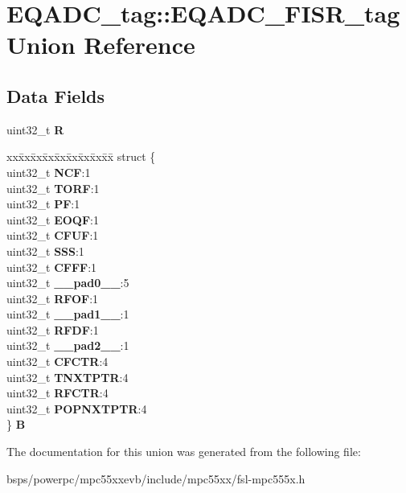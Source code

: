 \hypertarget{unionEQADC__tag_1_1EQADC__FISR__tag}{}\section{E\+Q\+A\+D\+C\+\_\+tag\+::E\+Q\+A\+D\+C\+\_\+\+F\+I\+S\+R\+\_\+tag Union Reference}
\label{unionEQADC__tag_1_1EQADC__FISR__tag}
\subsection*{Data Fields}
\begin{DoxyCompactItemize}
\item 
\mbox{\label{unionEQADC__tag_1_1EQADC__FISR__tag_a3b2611de6a80e6e75b82492514c0eb87}} 
uint32\+\_\+t {\bfseries R}
\item 
\mbox{\label{unionEQADC__tag_1_1EQADC__FISR__tag_a640eddb91fea5d64d2336735ff9bcddd}} 
\begin{tabbing}
xx\=xx\=xx\=xx\=xx\=xx\=xx\=xx\=xx\=\kill
struct \{\\
\>uint32\_t {\bfseries NCF}:1\\
\>uint32\_t {\bfseries TORF}:1\\
\>uint32\_t {\bfseries PF}:1\\
\>uint32\_t {\bfseries EOQF}:1\\
\>uint32\_t {\bfseries CFUF}:1\\
\>uint32\_t {\bfseries SSS}:1\\
\>uint32\_t {\bfseries CFFF}:1\\
\>uint32\_t {\bfseries \_\_pad0\_\_}:5\\
\>uint32\_t {\bfseries RFOF}:1\\
\>uint32\_t {\bfseries \_\_pad1\_\_}:1\\
\>uint32\_t {\bfseries RFDF}:1\\
\>uint32\_t {\bfseries \_\_pad2\_\_}:1\\
\>uint32\_t {\bfseries CFCTR}:4\\
\>uint32\_t {\bfseries TNXTPTR}:4\\
\>uint32\_t {\bfseries RFCTR}:4\\
\>uint32\_t {\bfseries POPNXTPTR}:4\\
\} {\bfseries B}\\

\end{tabbing}\end{DoxyCompactItemize}


The documentation for this union was generated from the following file\+:\begin{DoxyCompactItemize}
\item 
bsps/powerpc/mpc55xxevb/include/mpc55xx/fsl-\/mpc555x.\+h\end{DoxyCompactItemize}

